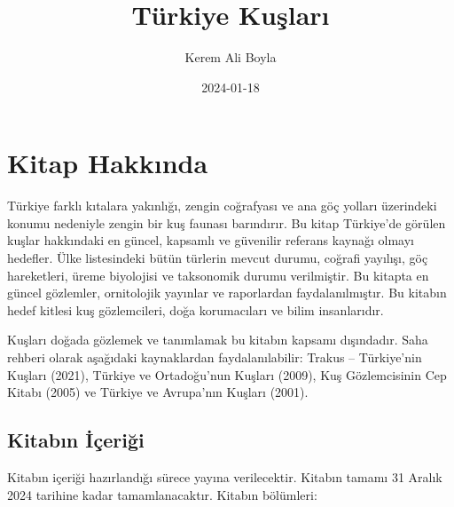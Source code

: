 \documentclass[
  letterpaper,
  DIV=11,
  numbers=noendperiod]{scrreprt}
\title{Türkiye Kuşları}
\author{Kerem Ali Boyla}
\date{2024-01-18}
\renewcommand*\contentsname{Table of contents}
\newcommand\contentsname{Table of contents}
\begin{document}
\maketitle
\ifdefined\Shaded\renewenvironment{Shaded}{\begin{tcolorbox}[boxrule=0pt, frame hidden, enhanced, sharp corners, breakable, borderline west={3pt}{0pt}{shadecolor}, interior hidden]}{\end{tcolorbox}}\fi

\renewcommand*\contentsname{Table of contents}
{
\hypersetup{linkcolor=}
\setcounter{tocdepth}{2}
\tableofcontents
}

\hypertarget{kitap-hakkux131nda}{%
\chapter*{Kitap Hakkında}\label{kitap-hakkux131nda}}


Türkiye farklı kıtalara yakınlığı, zengin coğrafyası ve ana göç yolları
üzerindeki konumu nedeniyle zengin bir kuş faunası barındırır. Bu kitap
Türkiye'de görülen kuşlar hakkındaki en güncel, kapsamlı ve güvenilir
referans kaynağı olmayı hedefler. Ülke listesindeki bütün türlerin
mevcut durumu, coğrafi yayılışı, göç hareketleri, üreme biyolojisi ve
taksonomik durumu verilmiştir. Bu kitapta en güncel gözlemler,
ornitolojik yayınlar ve raporlardan faydalanılmıştır. Bu kitabın hedef
kitlesi kuş gözlemcileri, doğa korumacıları ve bilim insanlarıdır.

Kuşları doğada gözlemek ve tanımlamak bu kitabın kapsamı dışındadır.
Saha rehberi olarak aşağıdaki kaynaklardan faydalanılabilir: Trakus --
Türkiye'nin Kuşları (2021), Türkiye ve Ortadoğu'nun Kuşları (2009), Kuş
Gözlemcisinin Cep Kitabı (2005) ve Türkiye ve Avrupa'nın Kuşları (2001).

\hypertarget{kitabux131n-iuxe7eriux11fi}{%
\section*{Kitabın İçeriği}\label{kitabux131n-iuxe7eriux11fi}}


Kitabın içeriği hazırlandığı sürece yayına verilecektir. Kitabın tamamı
31 Aralık 2024 tarihine kadar tamamlanacaktır. Kitabın bölümleri:
\end{document}
